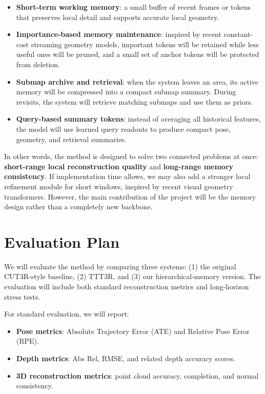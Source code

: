 \documentclass[10pt]{article}
\begin{document}
\begin{itemize}[leftmargin=1.6em]
  \item \textbf{Short-term working memory}: a small buffer of recent frames or tokens that preserves local detail and supports accurate local geometry.
  \item \textbf{Importance-based memory maintenance}: inspired by recent constant-cost streaming geometry models, important tokens will be retained while less useful ones will be pruned, and a small set of anchor tokens will be protected from deletion.
  \item \textbf{Submap archive and retrieval}: when the system leaves an area, its active memory will be compressed into a compact submap summary. During revisits, the system will retrieve matching submaps and use them as priors.
  \item \textbf{Query-based summary tokens}: instead of averaging all historical features, the model will use learned query readouts to produce compact pose, geometry, and retrieval summaries.
\end{itemize}

In other words, the method is designed to solve two connected problems at once: \textbf{short-range local reconstruction quality} and \textbf{long-range memory consistency}. If implementation time allows, we may also add a stronger local refinement module for short windows, inspired by recent visual geometry transformers. However, the main contribution of the project will be the memory design rather than a completely new backbone.

\section*{Evaluation Plan}
We will evaluate the method by comparing three systems: (1) the original CUT3R-style baseline, (2) TTT3R, and (3) our hierarchical-memory version. The evaluation will include both standard reconstruction metrics and long-horizon stress tests.

For standard evaluation, we will report:
\begin{itemize}[leftmargin=1.6em]
  \item \textbf{Pose metrics}: Absolute Trajectory Error (ATE) and Relative Pose Error (RPE).
  \item \textbf{Depth metrics}: Abs Rel, RMSE, and related depth accuracy scores.
  \item \textbf{3D reconstruction metrics}: point cloud accuracy, completion, and normal consistency.
\end{itemize}
\end{document}
